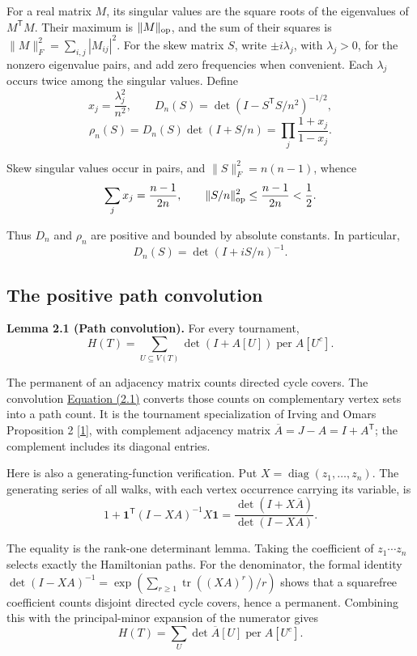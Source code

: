 \documentclass[11pt,a4paper]{article}
\makeatletter
\newcommand{\paperstatement}[3]{\par\addvspace{6pt}\Needspace{4\baselineskip}\phantomsection\def\@currentlabel{#2}\label{#3}\noindent\textbf{#1}\enspace}
\newcommand{\paperref}[2]{\hyperref[#1]{#2}}
\makeatother
\begin{document}
For a real matrix \(M\), its singular values are the square roots of the eigenvalues of \(M^{\mathsf T}M\). Their maximum is \(\|M\|_{\rm op}\), and the sum of their squares is \(\|M\|_F^2=\sum_{i,j}|M_{ij}|^2\). For the skew matrix \(S\), write \(\pm i\lambda_j\), with \(\lambda_j>0\), for the nonzero eigenvalue pairs, and add zero frequencies when convenient. Each \(\lambda_j\) occurs twice among the singular values. Define
\[x_j=\frac{\lambda_j^2}{n^2},\qquad
D_n(S)=\det(I-S^{\mathsf T}S/n^2)^{-1/2},\]
\nopagebreak[3]\[\rho_n(S)=D_n(S)\det(I+S/n)=\prod_j\frac{1+x_j}{1-x_j}.\]

Skew singular values occur in pairs, and \(\|S\|_F^2=n(n-1)\), whence
\[\sum_jx_j=\frac{n-1}{2n},\qquad \|S/n\|_{\rm op}^2\le\frac{n-1}{2n}<\frac12.\]

Thus \(D_n\) and \(\rho_n\) are positive and bounded by absolute constants. In particular,
\[D_n(S)=\det(I+iS/n)^{-1}.\]

\subsection{The positive path convolution}\label{sec-2.2}

\paperstatement{Lemma 2.1 (Path convolution).}{2.1}{thm-2.1} For every tournament,
\begin{equation}
H(T)=\sum_{U\subseteq V(T)}\det(I+A[U])\operatorname{per}A[U^c].
\tag{2.1}\label{eq-path-convolution}
\end{equation}

The permanent of an adjacency matrix counts directed cycle covers. The convolution \paperref{eq-path-convolution}{Equation (2.1)} converts those counts on complementary vertex sets into a path count. It is the tournament specialization of Irving and Omar\textquotesingle s Proposition 2 \paperref{bib-1}{[1]}, with complement adjacency matrix \(\overline A=J-A=I+A^{\mathsf T}\); the complement includes its diagonal entries.

Here is also a generating-function verification. Put \(X=\operatorname{diag}(z_1,\ldots,z_n)\). The generating series of all walks, with each vertex occurrence carrying its variable, is
\[1+\mathbf1^{\mathsf T}(I-XA)^{-1}X\mathbf1
=\frac{\det(I+X\overline A)}{\det(I-XA)}.\]

The equality is the rank-one determinant lemma. Taking the coefficient of \(z_1\cdots z_n\) selects exactly the Hamiltonian paths. For the denominator, the formal identity \(\det(I-XA)^{-1}=\exp(\sum_{r\ge1}\operatorname{tr}((XA)^r)/r)\) shows that a squarefree coefficient counts disjoint directed cycle covers, hence a permanent. Combining this with the principal-minor expansion of the numerator gives
\[H(T)=\sum_U\det\overline A[U]\operatorname{per}A[U^c].\]
\end{document}
